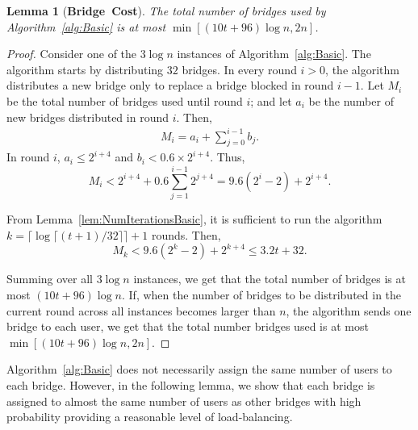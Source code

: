 \documentclass[letterpaper,twocolumn,10pt]{article}
\newcommand{\jared}[1]{}
\newtheorem{lemma}{Lemma}
\newcommand{\sfsize}{\fontsize{0.73\baselineskip}{0.73\baselineskip}\selectfont}
\newcommand{\sans}[1]{\textsf{\sfsize \mbox{#1}}}
\newcommand{\sansb}[1]{\textbf{\sans{\mbox{#1}}}}
\begin{document}
\begin{lemma}[\sansb{Bridge Cost}] \label{lem:NumBridgesBasic}
	The total number of bridges used by Algorithm~\ref{alg:Basic} is at most $\min\left[{(10t + 96)\log{n}}, 2n\right]$. %
\end{lemma}
\begin{proof}
	Consider one of the $3\log{n}$ instances of Algorithm~\ref{alg:Basic}. The algorithm starts by distributing  $32$ bridges. In every round ${i > 0}$, the algorithm distributes a new bridge only to replace a bridge blocked in round ${i-1}$. Let $M_i$ be the total number of bridges used until round $i$; and let $a_i$ be the number of new bridges distributed in round $i$.  Then, 
	\begin{align}
	M_i = a_i + \sum_{j=0}^{i-1} b_j. \label{eq:NumBridges}
	\end{align}
	In round $i$, ${a_i \leq 2^{i+4}}$ and ${b_i < 0.6 \times 2^{i+4}}$.  Thus,
	\[M_i < 2^{i+4} + 0.6\sum_{j=1}^{i-1} 2^{j+4} = 9.6(2^i - 2) + 2^{i+4}.\]
	
	From Lemma~\ref{lem:NumIterationsBasic}, it is sufficient to run the algorithm ${k = \lceil \log{\lceil (t+1)/32 \rceil} \rceil + 1}$ rounds. Then,	
	\[M_k < 9.6(2^k - 2) + 2^{k+4} \leq 3.2t + 32.\]
	
Summing over all $3 \log{n}$ instances, we get that the total number of bridges is at most $(10t + 96)\log{n}$. If, when the number of bridges to be distributed in the current round across all instances becomes larger than $n$, the algorithm sends one bridge to each user, we get that the total number bridges used is at most $\min\left[{(10t + 96)\log{n}}, 2n\right]$. %
\end{proof}

\jared{I'm moving this to the end, since it doesn't directly connect to the main theorem.}
Algorithm~\ref{alg:Basic} does not necessarily assign the same number of users to each bridge. However, in the following lemma, we show that each bridge is assigned to almost the same number of users as other bridges with high probability providing a reasonable level of load-balancing.
\end{document}

